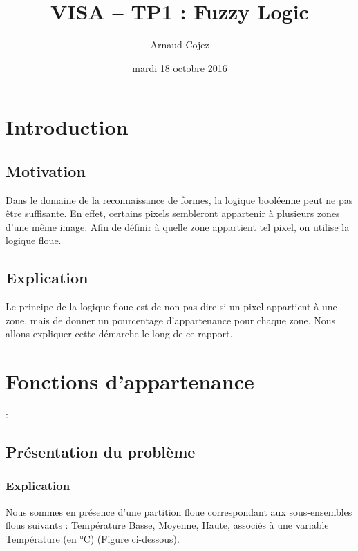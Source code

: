 \documentclass[a4paper]{article}
\begin{document}
\title{VISA -- TP1 : Fuzzy Logic}
\author{Arnaud Cojez}
\date{mardi 18 octobre 2016}

\maketitle

\newpage
\tableofcontents
\newpage

\section{Introduction}

\subsection{Motivation}
Dans le domaine de la reconnaissance de formes, la logique booléenne peut ne pas être suffisante. En effet, certains pixels sembleront appartenir à plusieurs zones d'une même image. Afin de définir à quelle zone appartient tel pixel, on utilise la logique floue.

\subsection{Explication}
Le principe de la logique floue est de non pas dire si un pixel appartient à une zone, mais de donner un pourcentage d'appartenance pour chaque zone.
Nous allons expliquer cette démarche le long de ce rapport.

\clearpage

\section{Fonctions d'appartenance}:

\subsection{Présentation du problème}

\subsubsection{Explication}
Nous sommes en présence d'une partition floue correspondant aux sous-ensembles flous suivants : Température Basse, Moyenne, Haute, associés à une variable Température (en °C) (Figure ci-dessous).
\end{document}
